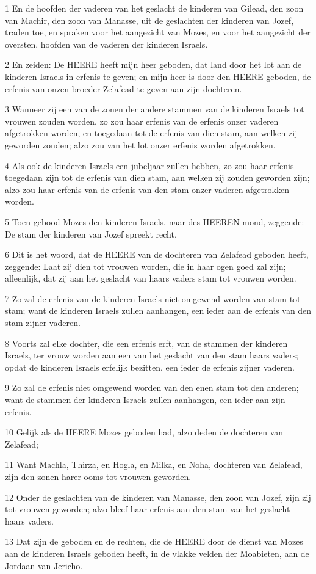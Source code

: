 \par 1 En de hoofden der vaderen van het geslacht de kinderen van Gilead, den zoon van Machir, den zoon van Manasse, uit de geslachten der kinderen van Jozef, traden toe, en spraken voor het aangezicht van Mozes, en voor het aangezicht der oversten, hoofden van de vaderen der kinderen Israels.
\par 2 En zeiden: De HEERE heeft mijn heer geboden, dat land door het lot aan de kinderen Israels in erfenis te geven; en mijn heer is door den HEERE geboden, de erfenis van onzen broeder Zelafead te geven aan zijn dochteren.
\par 3 Wanneer zij een van de zonen der andere stammen van de kinderen Israels tot vrouwen zouden worden, zo zou haar erfenis van de erfenis onzer vaderen afgetrokken worden, en toegedaan tot de erfenis van dien stam, aan welken zij geworden zouden; alzo zou van het lot onzer erfenis worden afgetrokken.
\par 4 Als ook de kinderen Israels een jubeljaar zullen hebben, zo zou haar erfenis toegedaan zijn tot de erfenis van dien stam, aan welken zij zouden geworden zijn; alzo zou haar erfenis van de erfenis van den stam onzer vaderen afgetrokken worden.
\par 5 Toen gebood Mozes den kinderen Israels, naar des HEEREN mond, zeggende: De stam der kinderen van Jozef spreekt recht.
\par 6 Dit is het woord, dat de HEERE van de dochteren van Zelafead geboden heeft, zeggende: Laat zij dien tot vrouwen worden, die in haar ogen goed zal zijn; alleenlijk, dat zij aan het geslacht van haars vaders stam tot vrouwen worden.
\par 7 Zo zal de erfenis van de kinderen Israels niet omgewend worden van stam tot stam; want de kinderen Israels zullen aanhangen, een ieder aan de erfenis van den stam zijner vaderen.
\par 8 Voorts zal elke dochter, die een erfenis erft, van de stammen der kinderen Israels, ter vrouw worden aan een van het geslacht van den stam haars vaders; opdat de kinderen Israels erfelijk bezitten, een ieder de erfenis zijner vaderen.
\par 9 Zo zal de erfenis niet omgewend worden van den enen stam tot den anderen; want de stammen der kinderen Israels zullen aanhangen, een ieder aan zijn erfenis.
\par 10 Gelijk als de HEERE Mozes geboden had, alzo deden de dochteren van Zelafead;
\par 11 Want Machla, Thirza, en Hogla, en Milka, en Noha, dochteren van Zelafead, zijn den zonen harer ooms tot vrouwen geworden.
\par 12 Onder de geslachten van de kinderen van Manasse, den zoon van Jozef, zijn zij tot vrouwen geworden; alzo bleef haar erfenis aan den stam van het geslacht haars vaders.
\par 13 Dat zijn de geboden en de rechten, die de HEERE door de dienst van Mozes aan de kinderen Israels geboden heeft, in de vlakke velden der Moabieten, aan de Jordaan van Jericho.



